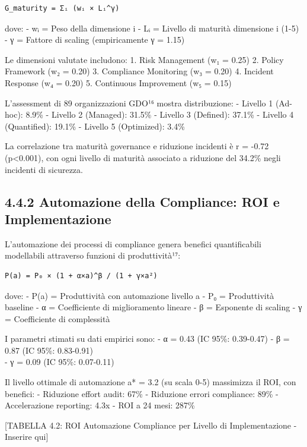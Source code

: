 \documentclass[12pt,a4paper,oneside]{book}
\numberwithin{figure}{chapter} %
\numberwithin{table}{chapter}  %
\begin{document}
\begin{verbatim}
G_maturity = Σᵢ (wᵢ × Lᵢ^γ)
\end{verbatim}

dove: - wᵢ = Peso della dimensione i - Lᵢ = Livello di maturità
dimensione i (1-5) - γ = Fattore di scaling (empiricamente γ = 1.15)

Le dimensioni valutate includono: 1. Risk Management (w₁ = 0.25) 2.
Policy Framework (w₂ = 0.20) 3. Compliance Monitoring (w₃ = 0.20) 4.
Incident Response (w₄ = 0.20) 5. Continuous Improvement (w₅ = 0.15)

L'assessment di 89 organizzazioni GDO¹⁶ mostra distribuzione: - Livello
1 (Ad-hoc): 8.9\% - Livello 2 (Managed): 31.5\% - Livello 3 (Defined):
37.1\% - Livello 4 (Quantified): 19.1\% - Livello 5 (Optimized): 3.4\%

La correlazione tra maturità governance e riduzione incidenti è r =
-0.72 (p\textless0.001), con ogni livello di maturità associato a
riduzione del 34.2\% negli incidenti di sicurezza.

\subsection{4.4.2 Automazione della Compliance: ROI e
Implementazione}\label{automazione-della-compliance-roi-e-implementazione}

L'automazione dei processi di compliance genera benefici quantificabili
modellabili attraverso funzioni di produttività¹⁷:

\begin{verbatim}
P(a) = P₀ × (1 + α×a)^β / (1 + γ×a²)
\end{verbatim}

dove: - P(a) = Produttività con automazione livello a - P₀ =
Produttività baseline - α = Coefficiente di miglioramento lineare - β =
Esponente di scaling - γ = Coefficiente di complessità

I parametri stimati su dati empirici sono: - α = 0.43 (IC 95\%:
0.39-0.47) - β = 0.87 (IC 95\%: 0.83-0.91)\\
- γ = 0.09 (IC 95\%: 0.07-0.11)

Il livello ottimale di automazione a* = 3.2 (su scala 0-5) massimizza il
ROI, con benefici: - Riduzione effort audit: 67\% - Riduzione errori
compliance: 89\% - Accelerazione reporting: 4.3x - ROI a 24 mesi: 287\%

{[}TABELLA 4.2: ROI Automazione Compliance per Livello di
Implementazione - Inserire qui{]}
\end{document}
